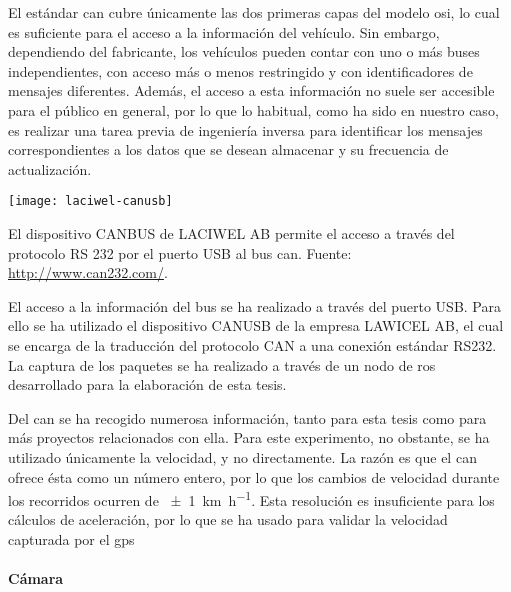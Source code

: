 El estándar \Acrshort{can} cubre únicamente las dos primeras capas del modelo \ac{osi}, lo cual es suficiente para el acceso a la información del vehículo. Sin embargo, dependiendo del fabricante, los vehículos pueden contar con uno o más buses independientes, con acceso más o menos restringido y con identificadores de mensajes diferentes. Además, el acceso a esta información no suele ser accesible para el público en general, por lo que lo habitual, como ha sido en nuestro caso, es realizar una tarea previa de ingeniería inversa para identificar los mensajes correspondientes a los datos que se desean almacenar y su frecuencia de actualización.

\begin{marginfigure}
	\centering
	\texttt{[image: laciwel-canusb]}
	\caption[Dispositivo \acrshort{can} BUS de LACIWEL AB]{El dispositivo CANBUS de LACIWEL AB permite el acceso a través del protocolo RS 232 por el puerto USB al bus \ac{can}. Fuente: \url{http://www.can232.com/}.}
	\label{fig:laciwel-canusb}
\end{marginfigure}

El acceso a la información del bus se ha realizado a través del puerto USB. Para ello se ha utilizado el dispositivo CANUSB de la empresa LAWICEL AB, el cual se encarga de la traducción del protocolo CAN a una conexión estándar RS232. La captura de los paquetes se ha realizado a través de un nodo de \ac{ros} desarrollado para la elaboración de esta tesis.

Del \Acrshort{can} se ha recogido numerosa información, tanto para esta tesis como para más proyectos relacionados con ella. Para este experimento, no obstante, se ha utilizado únicamente la velocidad, y no directamente. La razón es que el \Acrshort{can} ofrece ésta como un número entero, por lo que los cambios de velocidad durante los recorridos ocurren de \SI{\pm1}{\km\per\hour}. Esta resolución es insuficiente para los cálculos de aceleración, por lo que se ha usado para validar la velocidad capturada por el \Acrshort{gps}

\paragraph{Cámara}

